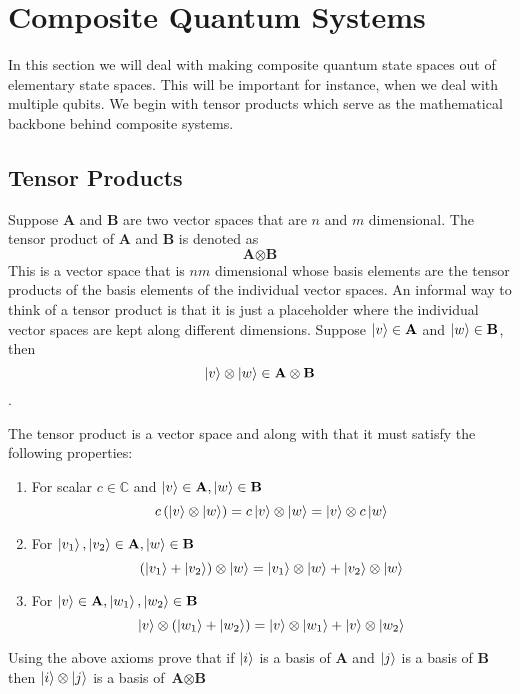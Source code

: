 \chapter{Composite Quantum Systems}
In this section we will deal with making composite quantum state spaces out of elementary state spaces. This will be important for instance, when we deal with multiple qubits. We begin with tensor products which serve as the mathematical backbone behind composite systems.

\section{Tensor Products}
Suppose \textbf{A} and \textbf{B} are two vector spaces that are $n$ and $m$ dimensional. The tensor product of \textbf{A} and \textbf{B} is denoted as 
$$ \textbf{A} \otimes \textbf{B}$$
This is a vector space that is $nm$ dimensional whose basis elements are the tensor products of the basis elements of the individual vector spaces. An informal way to think of a tensor product is that it is just a placeholder where the individual vector spaces are kept along different dimensions. Suppose $\ket{v} \in \textbf{A}$ and $\ket{w} \in \textbf{B}$, then $$\ket{v} \otimes \ket{w} \in \textbf{A} \otimes \textbf{B}$$.

The tensor product is a vector space and along with that it must satisfy the following properties:
\begin{enumerate}
    \item For scalar $c \in \mathbb{C}$ and $\ket{v} \in \textbf{A}, \ket{w} \in \textbf{B}$ $$c \left(\ket{v} \otimes \ket{w}\right) = c\ket{v}\otimes \ket{w} = \ket{v}\otimes c\ket{w}$$
     \item For $\ket{v_1}, \ket{v_2}  \in \textbf{A}, \ket{w} \in \textbf{B}$ $$ \left(\ket{v_1} + \ket{v_2}\right) \otimes \ket{w} = \ket{v_1}\otimes \ket{w} + \ket{v_2}\otimes \ket{w}$$
      \item For $\ket{v}  \in \textbf{A}, \ket{w_1}, \ket{w_2} \in \textbf{B}$ $$ \ket{v}  \otimes \left(\ket{w_1} + \ket{w_2}\right) = \ket{v}\otimes \ket{w_1} + \ket{v}\otimes \ket{w_2}$$
\end{enumerate}

\begin{exercise}
Using the above axioms prove that if $\ket{i}$ is a basis of $\textbf{A}$ and $\ket{j}$ is a basis of $\textbf{B}$ then $\ket{i} \otimes \ket{j}$ is a basis of $\textbf{A} \otimes \textbf{B}$
\end{exercise}

